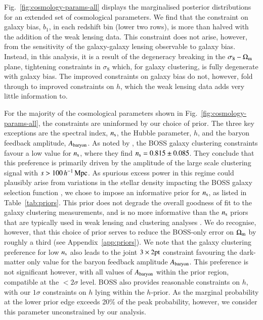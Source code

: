 Fig.~\ref{fig:cosmology-params-all} displays the marginalised posterior distributions for an extended set of cosmological parameters.   We find that the constraint on galaxy bias,  $b_1$, in each redshift bin (lower two rows), is more than halved with the addition of the weak lensing data.   This constraint does not arise, however, from the sensitivity of the galaxy-galaxy lensing observable to galaxy bias.  Instead, in this analysis, it is a result of the degeneracy breaking in the $\sigma_8-\Omega_{\rm m}$ plane, tightening constraints in $\sigma_8$ which, for galaxy clustering, is fully degenerate with galaxy bias.  The improved constraints on galaxy bias do not, however, fold through to improved constraints on $h$, which the weak lensing data adds very little information to.

For the majority of the cosmological parameters shown in Fig.~\ref{fig:cosmology-params-all}, the constraints are uninformed by our choice of prior.  The three key exceptions are the spectral index, $n_{\rm s}$, the Hubble parameter, $h$, and the baryon feedback amplitude, $A_{\rm baryon}$.  As noted by \citet{troester/etal:2020}, the BOSS galaxy clustering constraints favour a low value for $n_{\rm s}$, where they find $n_{\rm s} = 0.815 \pm 0.085$.  They conclude that this preference is primarily driven by the amplitude of the large scale clustering signal with $s > 100 \, h^{-1}\, {\rm Mpc}$.  As spurious excess power in this regime could plausibly arise from variations in the stellar density impacting the BOSS galaxy selection function \citep{ross/etal:2017}, we chose to impose an informative prior for $n_{\rm s}$, as listed in Table~\ref{tab:priors}.   This prior does not degrade the overall goodness of fit to the galaxy clustering measurements, and is no more informative than the $n_{\rm s}$ priors that are typically used in weak lensing and clustering analyses \citep[see for example][]{sanchez/etal:2017,abbott/etal:2018}.  We do recognise, however, that this choice of prior serves to reduce the BOSS-only error on $\Omega_{\rm m}$ by roughly a third (see Appendix~\ref{app:priors}).   We note that the galaxy clustering preference for low $n_{\rm s}$ also leads to the joint $3\times2{\rm pt}$ constraint favouring the dark-matter only value for the baryon feedback amplitude $A_{\rm baryon}$.   This preference is not significant however, with all values of $A_{\rm baryon}$ within the prior region, compatible at the $<2 \sigma$ level.   BOSS also provides reasonable constraints on $h$, with our $1\sigma$ constraints on $h$ lying within the $h$-prior.   As the marginal probability at the lower prior edge exceeds 20\% of the peak probability, however, we consider this parameter unconstrained by our analysis.

